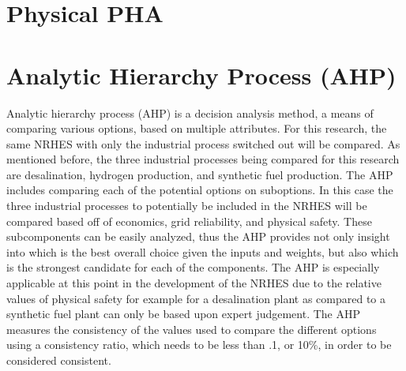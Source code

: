 \documentclass[12pt]{UIdahoMastersThesis}
\begin{document}
\section{Physical PHA}

\section{Analytic Hierarchy Process (AHP)}
Analytic hierarchy process (AHP) is a decision analysis method, a means of comparing various options, based on multiple attributes. For this research, the same NRHES with only the industrial process switched out will be compared. As mentioned before, the three industrial processes being compared for this research are desalination, hydrogen production, and synthetic fuel production. The AHP includes comparing each of the potential options on suboptions. In this case the three industrial processes to potentially be included in the NRHES will be compared based off of economics, grid reliability, and physical safety. These subcomponents can be easily analyzed, thus the AHP provides not only insight into which is the best overall choice given the inputs and weights, but also which is the strongest candidate for each of the components. The AHP is especially applicable at this point in the development of the NRHES due to the relative values of physical safety for example for a desalination plant as compared to a synthetic fuel plant can only be based upon expert judgement. The AHP measures the consistency of the values used to compare the different options using a consistency ratio, which needs to be less than .1, or 10\%, in order to be considered consistent.
\end{document}
